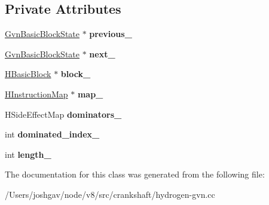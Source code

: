 \subsection*{Private Attributes}
\begin{DoxyCompactItemize}
\item 
\hyperlink{classv8_1_1internal_1_1_gvn_basic_block_state}{Gvn\+Basic\+Block\+State} $\ast$ {\bfseries previous\+\_\+}\hypertarget{classv8_1_1internal_1_1_gvn_basic_block_state_ade20cd53537a36adbc9a692deccb22ad}{}\label{classv8_1_1internal_1_1_gvn_basic_block_state_ade20cd53537a36adbc9a692deccb22ad}

\item 
\hyperlink{classv8_1_1internal_1_1_gvn_basic_block_state}{Gvn\+Basic\+Block\+State} $\ast$ {\bfseries next\+\_\+}\hypertarget{classv8_1_1internal_1_1_gvn_basic_block_state_a3c9f9928479fc1c8821ba27306e47710}{}\label{classv8_1_1internal_1_1_gvn_basic_block_state_a3c9f9928479fc1c8821ba27306e47710}

\item 
\hyperlink{classv8_1_1internal_1_1_h_basic_block}{H\+Basic\+Block} $\ast$ {\bfseries block\+\_\+}\hypertarget{classv8_1_1internal_1_1_gvn_basic_block_state_a4fb99e67e91e4b970e74edcb4c893723}{}\label{classv8_1_1internal_1_1_gvn_basic_block_state_a4fb99e67e91e4b970e74edcb4c893723}

\item 
\hyperlink{classv8_1_1internal_1_1_h_instruction_map}{H\+Instruction\+Map} $\ast$ {\bfseries map\+\_\+}\hypertarget{classv8_1_1internal_1_1_gvn_basic_block_state_a09dc0e8d0a7cf7116e8ab39bd24c39b6}{}\label{classv8_1_1internal_1_1_gvn_basic_block_state_a09dc0e8d0a7cf7116e8ab39bd24c39b6}

\item 
H\+Side\+Effect\+Map {\bfseries dominators\+\_\+}\hypertarget{classv8_1_1internal_1_1_gvn_basic_block_state_ab06b0b554e7eb921a184e1ea3d1685b5}{}\label{classv8_1_1internal_1_1_gvn_basic_block_state_ab06b0b554e7eb921a184e1ea3d1685b5}

\item 
int {\bfseries dominated\+\_\+index\+\_\+}\hypertarget{classv8_1_1internal_1_1_gvn_basic_block_state_a8968083b4f04887295315f977ccc082d}{}\label{classv8_1_1internal_1_1_gvn_basic_block_state_a8968083b4f04887295315f977ccc082d}

\item 
int {\bfseries length\+\_\+}\hypertarget{classv8_1_1internal_1_1_gvn_basic_block_state_a02831ab6066a1ddb77a35c31c815f810}{}\label{classv8_1_1internal_1_1_gvn_basic_block_state_a02831ab6066a1ddb77a35c31c815f810}

\end{DoxyCompactItemize}


The documentation for this class was generated from the following file\+:\begin{DoxyCompactItemize}
\item 
/\+Users/joshgav/node/v8/src/crankshaft/hydrogen-\/gvn.\+cc\end{DoxyCompactItemize}
